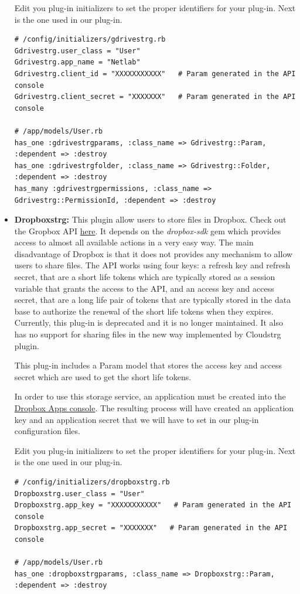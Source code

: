 \documentclass{article}
\begin{document}
\begin{itemize}
Edit you plug-in initializers to set the proper identifiers for your plug-in. Next is the one used in our plug-in.

\begin{verbatim}
# /config/initializers/gdrivestrg.rb
Gdrivestrg.user_class = "User"
Gdrivestrg.app_name = "Netlab"
Gdrivestrg.client_id = "XXXXXXXXXXX"   # Param generated in the API console
Gdrivestrg.client_secret = "XXXXXXX"   # Param generated in the API console

# /app/models/User.rb
has_one :gdrivestrgparams, :class_name => Gdrivestrg::Param, :dependent => :destroy
has_one :gdrivestrgfolder, :class_name => Gdrivestrg::Folder, :dependent => :destroy
has_many :gdrivestrgpermissions, :class_name => Gdrivestrg::PermissionId, :dependent => :destroy
\end{verbatim}

\item \textbf{Dropboxstrg:} This plugin allow users to store files in Dropbox. Check out the Gropbox API \href{https://www.dropbox.com/developers/core/start/ruby}{here}. It depends on the \textit{dropbox-sdk} gem which provides access to almost all available actions in a very easy way. The main disadvantage of Dropbox is that it does not provides any mechanism to allow users to share files. The API works using four keys: a refresh key and refresh secret, that are a short life tokens which are typically stored as a session variable that grants the access to the API, and an access key and access secret, that are a long life pair of tokens that are typically stored in the data base to authorize the renewal of the short life tokens when they expires. Currently, this plug-in is deprecated and it is no longer maintained. It also has no support for sharing files in the new way implemented by Cloudstrg plugin. 

This plug-in includes a Param model that stores the access key and access secret which are used to get the short life tokens.

In order to use this storage service, an application must be created into the \href{https://www.dropbox.com/developers/apps}{Dropbox Apps console}. The resulting process will have created an application key and an application secret that we will have to set in our plug-in configuration files.

Edit you plug-in initializers to set the proper identifiers for your plug-in. Next is the one used in our plug-in.
\begin{verbatim}
# /config/initializers/dropboxstrg.rb
Dropboxstrg.user_class = "User"
Dropboxstrg.app_key = "XXXXXXXXXXX"   # Param generated in the API console
Dropboxstrg.app_secret = "XXXXXXX"   # Param generated in the API console

# /app/models/User.rb
has_one :dropboxstrgparams, :class_name => Dropboxstrg::Param, :dependent => :destroy
\end{verbatim}

\end{itemize}
\end{document}
